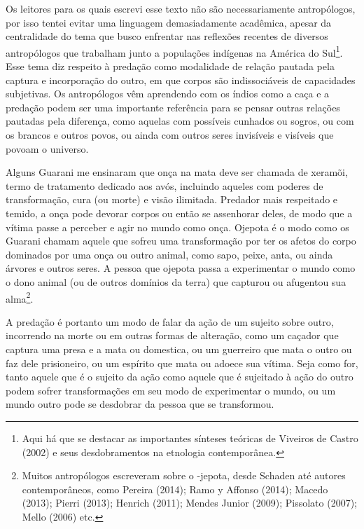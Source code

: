 \documentclass{article}
\begin{document}
Os leitores para os quais escrevi esse texto n\~ao s\~ao necessariamente
antrop\'ologos, por isso tentei evitar uma linguagem demasiadamente
acad\^emica, apesar da centralidade do tema que busco enfrentar nas
reflex\~oes recentes de diversos antrop\'ologos que trabalham junto a
popula\c{c}\~oes ind\'igenas na Am\'erica do Sul\footnote{ Aqui h\'a
que se destacar as importantes s\'inteses te\'oricas de Viveiros de
Castro (2002) e seus desdobramentos na etnologia contempor\^anea.}.
Esse tema diz respeito \`a preda\c{c}\~ao como modalidade de
rela\c{c}\~ao pautada pela captura e incorpora\c{c}\~ao do outro, em
que corpos s\~ao indissoci\'aveis de capacidades subjetivas. Os
antrop\'ologos v\^em aprendendo com os \'indios como a ca\c{c}a e a
preda\c{c}\~ao podem ser uma importante refer\^encia para se pensar
outras rela\c{c}\~oes pautadas pela diferen\c{c}a, como aquelas com
poss\'iveis cunhados ou sogros, ou com os brancos e outros povos, ou
ainda com outros seres invis\'iveis e vis\'iveis que povoam o universo.

Alguns Guarani me ensinaram que on\c{c}a na mata deve ser chamada de
xeram\~oi, termo de tratamento dedicado aos av\'os, incluindo aqueles
com poderes de transforma\c{c}\~ao, cura (ou morte) e vis\~ao
ilimitada. Predador mais respeitado e temido, a on\c{c}a pode devorar
corpos ou ent\~ao se assenhorar deles, de modo que a v\'itima passe a
perceber e agir no mundo como on\c{c}a. Ojepota \'e o modo como os
Guarani chamam aquele que sofreu uma transforma\c{c}\~ao por ter os
afetos do corpo dominados por uma on\c{c}a ou outro animal, como sapo,
peixe, anta, ou ainda \'arvores e outros seres. A pessoa que ojepota
passa a experimentar o mundo como o dono animal (ou de outros
dom\'inios da terra) que capturou ou afugentou sua alma\footnote{
Muitos antrop\'ologos escreveram sobre o -jepota, desde Schaden at\'e
autores contempor\^aneos, como Pereira (2014); Ramo y Affonso (2014);
Macedo (2013); Pierri (2013); Henrich (2011); Mendes Junior (2009);
Pissolato (2007); Mello (2006) etc.}.

A preda\c{c}\~ao \'e portanto um modo de falar da a\c{c}\~ao de um
sujeito sobre outro, incorrendo na morte ou em outras formas de
altera\c{c}\~ao, como um ca\c{c}ador que captura uma presa e a mata ou
domestica, ou um guerreiro que mata o outro ou faz dele prisioneiro, ou
um esp\'irito que mata ou adoece sua v\'itima. Seja como for, tanto
aquele que \'e o sujeito da a\c{c}\~ao como aquele que \'e sujeitado
\`a a\c{c}\~ao do outro podem sofrer transforma\c{c}\~oes em seu modo
de experimentar o mundo, ou um mundo outro pode se desdobrar da pessoa
que se transformou.
\end{document}
